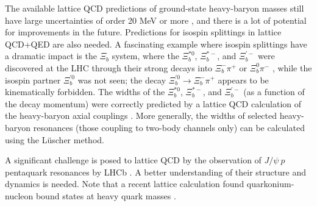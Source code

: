 The available lattice QCD predictions of ground-state heavy-baryon masses still have large uncertainties of order 20 MeV or more \cite{Brown:2014ena, Padmanath:2015jea, Bali:2015lka, Alexandrou:2017xwd},
and there is a lot of potential for improvements in the future. Predictions for isospin splittings in lattice QCD+QED are also needed. A fascinating example
where isospin splittings have a dramatic impact is the $\Xi_b$ system, where the $\Xi_b^{*0}$, $\Xi_b^{*-}$, and $\Xi_b^{\prime -}$ were discovered at the LHC
through their strong decays into $\Xi_b^-\pi^+$ or $\Xi_b^0\pi^-$ \cite{Chatrchyan:2012ni, Aaij:2014yka, Aaij:2016jnn}, while the isospin partner $\Xi_b^{\prime 0}$ was not seen;
the decay $\Xi_b^{\prime 0}\to\Xi_b^-\pi^+$ appears to be kinematically forbidden. The widths of the $\Xi_b^{*0}$, $\Xi_b^{*-}$, and $\Xi_b^{\prime -}$ (as a function of the decay momentum)
were correctly predicted by a lattice QCD calculation of the heavy-baryon axial couplings \cite{Detmold:2012ge}. More generally, the widths of selected heavy-baryon resonances (those coupling to two-body channels only)
can be calculated using the L\"uscher method.

A significant challenge is posed to lattice QCD by the observation of $J/\psi\: p$ pentaquark resonances by LHCb \cite{Aaij:2015tga}. A better understanding
of their structure and dynamics is needed. Note that a recent lattice calculation found quarkonium-nucleon bound states at heavy quark masses \cite{Beane:2014sda}.



% 
% 
% 



